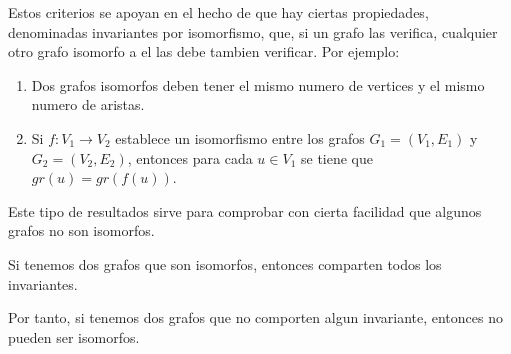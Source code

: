 Estos criterios se apoyan en el hecho de que hay ciertas propiedades, denominadas invariantes por isomorfismo, que, si un grafo las verifica, cualquier otro grafo isomorfo a el las debe tambien verificar. Por ejemplo:
\begin{enumerate}
	\item Dos grafos isomorfos deben tener el mismo numero de vertices y el mismo numero de aristas.
	\item Si \(f \colon V_1 \to V_2 \) establece un isomorfismo entre los grafos \(G_1 = (V_1, E_1 )\) y \(G_2 = (V_2, E_2 )\), entonces para cada \(u \in V_1 \) se tiene que \(gr(u) = gr(f(u ))\).
\end{enumerate}
Este tipo de resultados sirve para comprobar con cierta facilidad que algunos grafos no son isomorfos.

\begin{theorem}
	Si tenemos dos grafos que son isomorfos, entonces comparten todos los invariantes.

	Por tanto, si tenemos dos grafos que no comporten algun invariante, entonces no pueden ser isomorfos.
\end{theorem}

